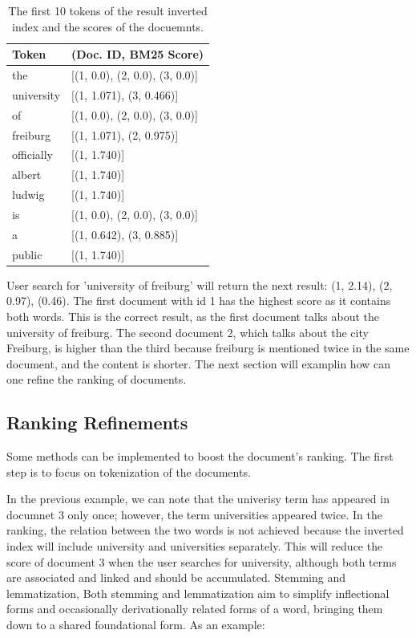 \begin{table}[ht] 
{\footnotesize
\begin{tabular}{ P{2.5cm} ||P{11.1cm}  }      %
 \hline \hline
Token & (Doc. ID, BM25 Score)\T\B 
\\ 
\hline
the & [(1, 0.0), (2, 0.0), (3, 0.0)] \T\B 
\\ 
\hline
university &  [(1, 1.071), (3, 0.466)] \T\B 
\\ 
\hline
of  &  [(1, 0.0), (2, 0.0), (3, 0.0)] \T\B 
\\
\hline
freiburg  &  [(1, 1.071), (2, 0.975)] \T\B 
\\ 
\hline
officially  &  [(1, 1.740)] \T\B 
\\ 
\hline
albert  & [(1, 1.740)]\T\B 
\\ 
\hline
ludwig  &  [(1, 1.740)] \T\B 
\\ 
\hline
is  & [(1, 0.0), (2, 0.0), (3, 0.0)] \T\B 
\\ 
\hline
a  & [(1, 0.642), (3, 0.885)] \T\B 
\\ 
\hline
public  &  [(1, 1.740)] \T\B 
\\ 
\hline \hline
    \end{tabular}
}
  \captionsetup{justification=centering,margin=2cm}
  \caption{The first 10 tokens of the result inverted index and the scores of the docuemnts. }
\end{table}

User search for 'university of freiburg' will return the next result: (1, 2.14), (2, 0.97), (0.46). The first document with id 1 has the highest score as it contains both words. This is the correct result, as the first document talks about the university of freiburg. The second document 2, which talks about the city Freiburg, is higher than the third because freiburg is mentioned twice in the same document, and the content is shorter. The next section will examplin how can one refine the ranking of documents.

\subsection{Ranking Refinements}
Some methods can be implemented to boost the document's ranking. The first step is to focus on tokenization of the documents. 

In the previous example, we can note that the univerisy term has appeared in documnet 3 only once; however, the term universities appeared twice. In the ranking, the relation between the two words is not achieved because the inverted index will include university and universities separately. This will reduce the score of document 3 when the user searches for university, although both terms are associated and linked and should be accumulated. Stemming and lemmatization, Both stemming and lemmatization aim to simplify inflectional forms and occasionally derivationally related forms of a word, bringing them down to a shared foundational form. As an example:

